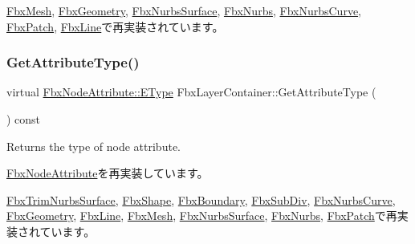 \hyperlink{class_fbx_mesh_a1755e89d515fadbc2d52924917b618f7}{Fbx\+Mesh}, \hyperlink{class_fbx_geometry_a07e94f7801067d66429afbf1799795cd}{Fbx\+Geometry}, \hyperlink{class_fbx_nurbs_surface_ab9ff252170ad2dc35958af782962a5c9}{Fbx\+Nurbs\+Surface}, \hyperlink{class_fbx_nurbs_a8a5ea388bc948e47ab65e1705f98f402}{Fbx\+Nurbs}, \hyperlink{class_fbx_nurbs_curve_a8c562cccf434c37cb3aad0df27d60e86}{Fbx\+Nurbs\+Curve}, \hyperlink{class_fbx_patch_a7e094310626891214577dabe4ff145f9}{Fbx\+Patch}, \hyperlink{class_fbx_line_a92abd64f6b58057c899bf5733a2e2275}{Fbx\+Line}で再実装されています。

\mbox{\label{class_fbx_layer_container_a578a24bfcd49464813a4b5b08a12ec59}} 
\subsubsection{\texorpdfstring{Get\+Attribute\+Type()}{GetAttributeType()}}
{\footnotesize\ttfamily virtual \hyperlink{class_fbx_node_attribute_a08e1669d3d1a696910756ab17de56d6a}{Fbx\+Node\+Attribute\+::\+E\+Type} Fbx\+Layer\+Container\+::\+Get\+Attribute\+Type (\begin{DoxyParamCaption}{ }\end{DoxyParamCaption}) const\hspace{0.3cm}{\ttfamily [virtual]}}

Returns the type of node attribute. 

\hyperlink{class_fbx_node_attribute_a1c2116756906127145a2b8721fc26752}{Fbx\+Node\+Attribute}を再実装しています。



\hyperlink{class_fbx_trim_nurbs_surface_a2d60f9613978db561ac32e2efff35104}{Fbx\+Trim\+Nurbs\+Surface}, \hyperlink{class_fbx_shape_a976141cda408244bd89c44c7a6b22d4b}{Fbx\+Shape}, \hyperlink{class_fbx_boundary_a093be9c6c0c0f13a337e9b6815aed9d0}{Fbx\+Boundary}, \hyperlink{class_fbx_sub_div_ac109cef6a177563eab80e28d414289a3}{Fbx\+Sub\+Div}, \hyperlink{class_fbx_nurbs_curve_aa6ec087af306c42ac814d43ea80c60b3}{Fbx\+Nurbs\+Curve}, \hyperlink{class_fbx_geometry_a41ae23e5d0cf08693bca49737f333de9}{Fbx\+Geometry}, \hyperlink{class_fbx_line_a3307097464d924b2c95c6687e41d69c9}{Fbx\+Line}, \hyperlink{class_fbx_mesh_a5a52e41ccf1382c40d3361ec3cfbb68a}{Fbx\+Mesh}, \hyperlink{class_fbx_nurbs_surface_a7c075984ec95a01b9cb6031e19cbd0cf}{Fbx\+Nurbs\+Surface}, \hyperlink{class_fbx_nurbs_a6c810e3a50538b346cbbf61338dca907}{Fbx\+Nurbs}, \hyperlink{class_fbx_patch_a4eb7de708949e012e0dcae2cb87a2ef4}{Fbx\+Patch}で再実装されています。

